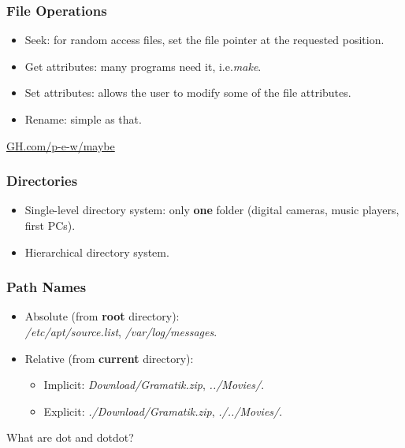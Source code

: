 \begin{frame}
  \frametitle{File Operations}
    \begin{itemize}
      \item Seek: for random access files, set the file pointer at the requested position.
      \item Get attributes: many programs need it, i.e.\emph{make}.
      \item Set attributes: allows the user to modify some of the file attributes.
      \item Rename: simple as that.
    \end{itemize}
    \color{blue}\href{https://github.com/p-e-w/maybe}{GH.com/p-e-w/maybe}
\end{frame}

\begin{frame}
  \frametitle{Directories}
    \begin{itemize}
      \item Single-level directory system: only \textbf{one} folder (digital cameras, music players, first PCs).
      \item Hierarchical directory system.
    \end{itemize}
\end{frame}

\begin{frame}
  \frametitle{Path Names}
    \begin{itemize}
      \item Absolute (from \textbf{root} directory): \\ \emph{/etc/apt/source.list}, \emph{/var/log/messages}.
      \item Relative (from \textbf{current} directory):
        \begin{itemize}
          \item Implicit: \emph{Download/Gramatik.zip}, \emph{../Movies/}.
          \item Explicit: \emph{./Download/Gramatik.zip}, \emph{./../Movies/}.
        \end{itemize}
    \end{itemize}
    What are dot and dotdot?
\end{frame}

